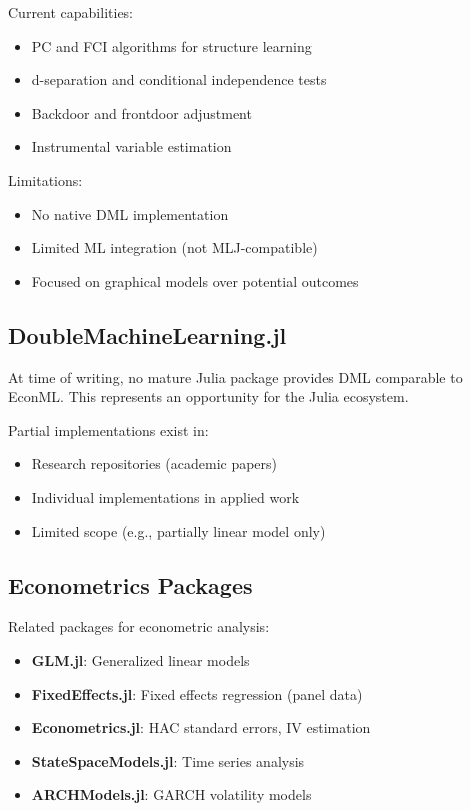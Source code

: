 Current capabilities:
\begin{itemize}
    \item PC and FCI algorithms for structure learning
    \item d-separation and conditional independence tests
    \item Backdoor and frontdoor adjustment
    \item Instrumental variable estimation
\end{itemize}

Limitations:
\begin{itemize}
    \item No native DML implementation
    \item Limited ML integration (not MLJ-compatible)
    \item Focused on graphical models over potential outcomes
\end{itemize}

\subsection{DoubleMachineLearning.jl}

At time of writing, no mature Julia package provides DML comparable to EconML. This represents an opportunity for the Julia ecosystem.

Partial implementations exist in:
\begin{itemize}
    \item Research repositories (academic papers)
    \item Individual implementations in applied work
    \item Limited scope (e.g., partially linear model only)
\end{itemize}

\subsection{Econometrics Packages}

Related packages for econometric analysis:

\begin{itemize}
    \item \textbf{GLM.jl}: Generalized linear models
    \item \textbf{FixedEffects.jl}: Fixed effects regression (panel data)
    \item \textbf{Econometrics.jl}: HAC standard errors, IV estimation
    \item \textbf{StateSpaceModels.jl}: Time series analysis
    \item \textbf{ARCHModels.jl}: GARCH volatility models
\end{itemize}


